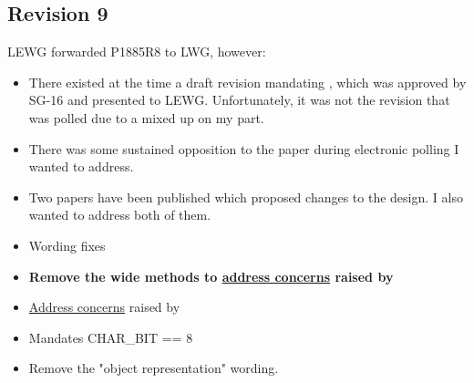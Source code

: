 \documentclass{wg21}
\begin{document}
\subsection*{Revision 9}

LEWG forwarded P1885R8 to LWG, however:
\begin{itemize}
    \item There existed at the time a draft revision mandating , which was approved by SG-16 and presented to LEWG. Unfortunately, it was not the revision that was polled due to a mixed up on my part.
    \item There was some sustained opposition to the paper during electronic polling I wanted to address.
    \item Two papers have been published which proposed changes to the design. I also wanted to address both of them.
\end{itemize}


\begin{itemize}
    \item Wording fixes
    \item \textbf{Remove the wide methods to \hyperref[P2491-concerns]{address concerns} raised by }
    \item \hyperref[P2498-concerns]{Address concerns} raised by 

    \item Mandates CHAR_BIT == 8
    \item Remove the "object representation" wording.
\end{itemize}
\end{document}
